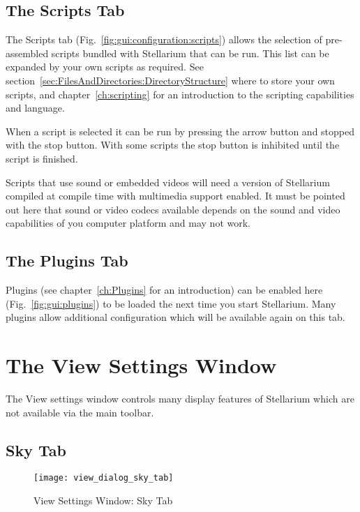 \subsection{The Scripts Tab}
\label{sec:gui:scripts}


The Scripts tab (Fig.~\ref{fig:gui:configuration:scripts}) allows the selection of
pre-assembled scripts bundled with Stellarium that can be run. This
list can be expanded by your own scripts as required. See
section~\ref{sec:FilesAndDirectories:DirectoryStructure} where to
store your own scripts, and chapter~\ref{ch:scripting} for an
introduction to the scripting capabilities and language.

When a script is selected it can be run by pressing the arrow button
and stopped with the stop button. With some scripts the stop button is
inhibited until the script is finished. %

Scripts that use sound or embedded videos will need a version of
Stellarium compiled at compile time with multimedia support
enabled. It must be pointed out here that sound or video codecs
available depends on the sound and video capabilities of you computer
platform and may not work.


\subsection{The Plugins Tab }
\label{sec:gui:configuration:plugins}


Plugins (see chapter~\ref{ch:Plugins} for an introduction) can be
enabled here (Fig.~\ref{fig:gui:plugins}) to be loaded the next time
you start Stellarium.  Many plugins allow additional configuration
which will be available again on this tab.




\section{The View Settings Window}
\label{sec:gui:view}

The View settings window controls many display features of Stellarium
which are not available via the main toolbar.

\subsection{Sky Tab}
\label{sec:gui:view:sky}

\begin{figure}[t]
\centering\texttt{[image: view\_dialog\_sky\_tab]}
\caption{View Settings Window: Sky Tab}
\label{fig:gui:view:sky}
\end{figure}

